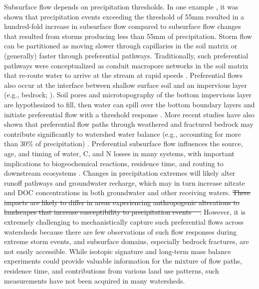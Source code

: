 \documentclass[preprint,review, 12pt]{elsarticle}
\providecommand{\DIFdel}[1]{{\protect\color{red}\sout{#1}}}                      %
\providecommand{\DIFdelbegin}{} %
\providecommand{\DIFdelend}{} %
\newcommand{\DIFscaledelfig}{0.5}
\newlength{\DIFdelgraphicswidth} %
\newlength{\DIFdelgraphicsheight} %
\newcommand{\DIFdelincludegraphics}[2][]{%
\sbox{\DIFdelgraphicsbox}{\DIFOincludegraphics[#1]{#2}}%
\settoboxwidth{\DIFdelgraphicswidth}{\DIFdelgraphicsbox} %
\settoboxtotalheight{\DIFdelgraphicsheight}{\DIFdelgraphicsbox} %
\scalebox{\DIFscaledelfig}{%
\parbox[b]{\DIFdelgraphicswidth}{\usebox{\DIFdelgraphicsbox}\\[-\baselineskip] \rule{\DIFdelgraphicswidth}{0em}}\llap{\resizebox{\DIFdelgraphicswidth}{\DIFdelgraphicsheight}{%
\setlength{\unitlength}{\DIFdelgraphicswidth}%
\begin{picture}(1,1)%
\thicklines\linethickness{2pt} %
{\color[rgb]{1,0,0}\put(0,0){\framebox(1,1){}}}%
{\color[rgb]{1,0,0}\put(0,0){\line( 1,1){1}}}%
{\color[rgb]{1,0,0}\put(0,1){\line(1,-1){1}}}%
\end{picture}%
}\hspace*{3pt}}} %
} %
\DeclareRobustCommand{\DIFdelbegin}{\DIFOdelbegin \let\includegraphics\DIFdelincludegraphics} %
\DeclareRobustCommand{\DIFdelend}{\DIFOaddend \let\includegraphics\DIFOincludegraphics} %
\begin{document}
Subsurface flow depends on precipitation thresholds. In one example \citep{Tromp-vanMeerveld2006}, it was shown that precipitation events exceeding the threshold of 55mm resulted in a hundred-fold increase in subsurface flow compared to subsurface flow changes that resulted from storms producing less than 55mm of precipitation. Storm flow can be partitioned as moving slower through capillaries in the soil matrix or (generally) faster through preferential pathways. Traditionally, such preferential pathways were conceptualized as conduit macropore networks in the soil matrix that re-route water to arrive at the stream at rapid speeds \citep{Beven1982}. Preferential flows also occur at the interface between shallow surface soil and an impervious layer (e.g., bedrock; \citealp{Freer2002, Graham2010, Hopp2009, Lehmann2007, McGlynn2003, Salve2012, Tani1997, Tromp-vanMeerveld2006a}). Soil pores and microtopography of the bottom impervious layer are hypothesized to fill, then water can spill over the bottom boundary layers and initiate preferential flow with a threshold response \citep{Tromp-vanMeerveld2006a}. More recent studies have also shown that preferential flow paths through weathered and fractured bedrock may contribute significantly to watershed water balance (e.g., accounting for more than 30\% of precipitation) \citep{Kosugi2006, Graham2010, Aishlin2011, Flinchum2018, Tromp-vanMeerveld2007}. Preferential subsurface flow influences the source, age, and timing of water, C, and N losses in many systems, with important implications to biogeochemical reactions, residence time, and routing to downstream ecosystems \citep{Lohse2009}. Changes in precipitation extremes will likely alter runoff pathways and groundwater recharge, which may in turn increase nitrate and DOC concentrations in both groundwater and other receiving waters. \DIFdelbegin \DIFdel{These impacts are likely to differ in areas experiencing anthropogenic alterations to landscapes that increase susceptibility to precipitation events \mbox{%
\citep{Walsh2005, Burns2012}}\hspace{0pt}%
. }\DIFdelend However, it is extremely challenging to mechanistically  capture such preferential flows across watersheds because there are few observations of such flow responses during extreme storm events, and subsurface domains, especially bedrock fractures, are not easily accessible. While isotopic signature and long-term mass balance experiments could provide valuable information for the mixture of flow paths, residence time, and contributions from various land use patterns, such measurements have not been acquired in many watersheds.
\end{document}
